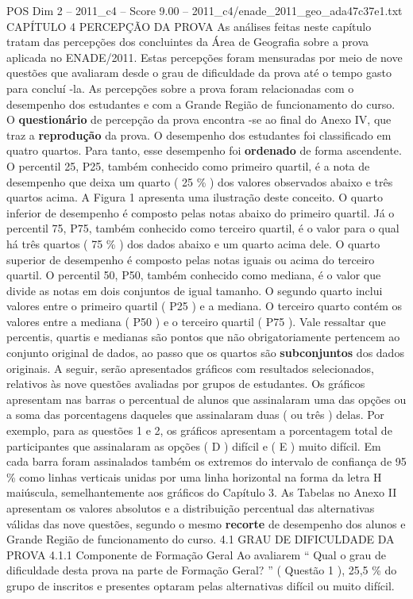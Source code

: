 \begin{textsample}{POS Dim 2 – 2011\_c4 – Score 9.00 – 2011\_c4/enade\_2011\_geo\_ada47c37e1.txt}  \label{ex:f2_pos_125}
CAPÍTULO 4 PERCEPÇÃO DA PROVA As análises feitas neste capítulo tratam das percepções dos concluintes da Área de Geografia sobre a prova aplicada no ENADE/2011.
Estas percepções foram mensuradas por meio de nove questões que avaliaram desde o grau de dificuldade da prova até o tempo gasto para concluí -la.
As percepções sobre a prova foram relacionadas com o desempenho dos estudantes e com a Grande Região de funcionamento do curso.
O \textbf{questionário} de percepção da prova encontra -se ao final do Anexo IV, que traz a \textbf{reprodução} da prova.
O desempenho dos estudantes foi classificado em quatro quartos.
Para tanto, esse desempenho foi \textbf{ordenado} de forma ascendente.
O percentil 25, P25, também conhecido como primeiro quartil, é a nota de desempenho que deixa um quarto ( 25 \% ) dos valores observados abaixo e três quartos acima.
A Figura 1 apresenta uma ilustração deste conceito.
O quarto inferior de desempenho é composto pelas notas abaixo do primeiro quartil.
Já o percentil 75, P75, também conhecido como terceiro quartil, é o valor para o qual há três quartos ( 75 \% ) dos dados abaixo e um quarto acima dele.
O quarto superior de desempenho é composto pelas notas iguais ou acima do terceiro quartil.
O percentil 50, P50, também conhecido como mediana, é o valor que divide as notas em dois conjuntos de igual tamanho.
O segundo quarto inclui valores entre o primeiro quartil ( P25 ) e a mediana.
O terceiro quarto contém os valores entre a mediana ( P50 ) e o terceiro quartil ( P75 ).
Vale ressaltar que percentis, quartis e medianas são pontos que não obrigatoriamente pertencem ao conjunto original de dados, ao passo que os quartos são \textbf{subconjuntos} dos dados originais.
A seguir, serão apresentados gráficos com resultados selecionados, relativos às nove questões avaliadas por grupos de estudantes.
Os gráficos apresentam nas barras o percentual de alunos que assinalaram uma das opções ou a soma das porcentagens daqueles que assinalaram duas ( ou três ) delas.
Por exemplo, para as questões 1 e 2, os gráficos apresentam a porcentagem total de participantes que assinalaram as opções ( D ) difícil e ( E ) muito difícil.
Em cada barra foram assinalados também os extremos do intervalo de confiança de 95 \% como linhas verticais unidas por uma linha horizontal na forma da letra H maiúscula, semelhantemente aos gráficos do Capítulo 3.
As Tabelas no Anexo II apresentam os valores absolutos e a distribuição percentual das alternativas válidas das nove questões, segundo o mesmo \textbf{recorte} de desempenho dos alunos e Grande Região de funcionamento do curso. 4.1 GRAU DE DIFICULDADE DA PROVA 4.1.1 Componente de Formação Geral Ao avaliarem “ Qual o grau de dificuldade desta prova na parte de Formação Geral? ” ( Questão 1 ), 25,5 \% do grupo de inscritos e presentes optaram pelas alternativas difícil ou muito difícil.

\end{textsample}
